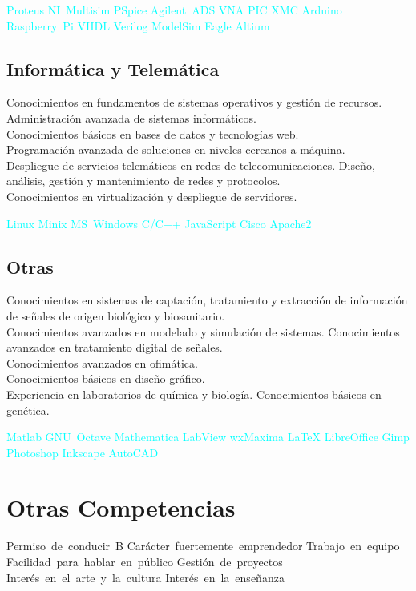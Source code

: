 \documentclass[11pt,a4paper,sans,spanish]{moderncv}
\begin{document}
\begin{center}
\textcolor{cyan}{
Proteus \quad{} NI~Multisim \quad{} PSpice \quad{}
Agilent~ADS \quad{} VNA \quad{}
PIC \quad{} XMC \quad{} Arduino \quad{} Raspberry~Pi \quad{}
VHDL \quad{} Verilog \quad{} ModelSim \quad{}
Eagle \quad{} Altium
}
\end{center}

\subsection{Informática y Telemática}
Conocimientos en fundamentos de sistemas operativos y gestión de recursos.
Administración avanzada de sistemas informáticos.
\protect\\[0.3em]
Conocimientos básicos en bases de datos y tecnologías web.
\protect\\[0.3em]
Programación avanzada de soluciones en niveles cercanos a máquina.
\protect\\[0.3em]
Despliegue de servicios telemáticos en redes de telecomunicaciones. Diseño, análisis, gestión y mantenimiento de redes y protocolos.
\protect\\[0.3em]
Conocimientos en virtualización y despliegue de servidores.

\begin{center}
\textcolor{cyan}{
Linux \quad{} Minix \quad{} MS~Windows \quad{} C/C++ \quad{} JavaScript \quad{} Cisco \quad{} Apache2 
}
\end{center}

\subsection{Otras}
Conocimientos en sistemas de captación, tratamiento y extracción de información de señales de origen biológico y biosanitario.
\protect\\[0.3em]
Conocimientos avanzados en modelado y simulación de sistemas.
Conocimientos avanzados en tratamiento digital de señales.
\protect\\[0.3em]
Conocimientos avanzados en ofimática.
\protect\\[0.3em]
Conocimientos básicos en diseño gráfico.
\protect\\[0.3em]
Experiencia en laboratorios de química y biología.
Conocimientos básicos en genética.

\begin{center}
\textcolor{cyan}{
Matlab \quad{} GNU~Octave \quad{} Mathematica \quad{} LabView \quad{} wxMaxima \quad{} LaTeX \quad{} LibreOffice \quad{} Gimp \quad{} Photoshop \quad{} Inkscape \quad{} AutoCAD
}
\end{center}


\section{Otras Competencias}
\begin{center}
Permiso~de~conducir~B \quad{} Carácter~fuertemente~emprendedor \quad{} Trabajo~en~equipo \quad{} Facilidad~para~hablar~en~público \quad{} Gestión~de~proyectos \quad{} Interés~en~el~arte~y~la~cultura \quad{} Interés~en~la~enseñanza
\end{center}
\end{document}
